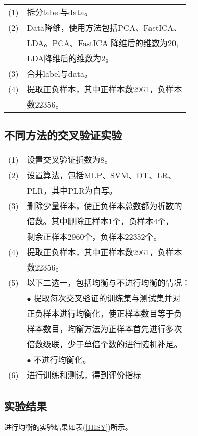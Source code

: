 \documentclass{acm_proc_article-sp}
\begin{document}
\begin{supertabular}{ll}
       (1)&	拆分label与data。\\
       (2)&	Data降维，使用方法包括PCA、FastICA、\\
       & LDA。PCA、FastICA 降维后的维数为20, \\
       &LDA降维后的维数为2。\\
       (3)&	合并label与data。\\
       (4)&	提取正负样本，其中正样本数2961，负样本\\
       &数22356。\\
\end{supertabular}

\subsection{\textsf{不同方法的交叉验证实验}}
\begin{supertabular}{ll}
       (1)&   设置交叉验证折数为8。\\
       (2)&	设置算法，包括MLP、SVM、DT、LR、\\
       & PLR，其中PLR为自写。\\
       (3)&	删除少量样本，使正负样本总数都为折数的\\
       & 倍数。其中删除正样本1个，负样本4个，\\
       & 剩余正样本2960个，负样本22352个。\\
       (4)&	提取正负样本，其中正样本数2961，负样本\\
       &数22356。\\
       (5)&	以下二选一，包括均衡与不进行均衡的情况：\\
       & $\bullet$ 提取每次交叉验证的训练集与测试集并对\\
       & 正负样本进行均衡化，使正样本数目等于负\\
       & 样本数目，均衡方法为正样本首先进行多次\\
       & 倍数级联，少于单倍个数的进行随机补足。\\
       & $\bullet$ 不进行均衡化。\\
       (6)&	进行训练和测试，得到评价指标\\
\end{supertabular}

\subsection{\textsf{实验结果}}
进行均衡的实验结果如表(\ref{JHSY})所示。
\end{document}
